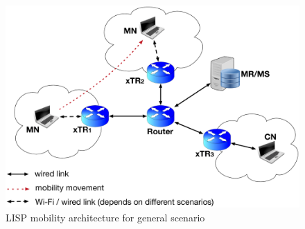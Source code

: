 \begin{figure}[!th]
	\centering
	\includegraphics[width=\textwidth]{Pics/LISP_mobility_archi}
	\caption{LISP mobility architecture for general scenario}
	\label{sim_archi}
\end{figure}

